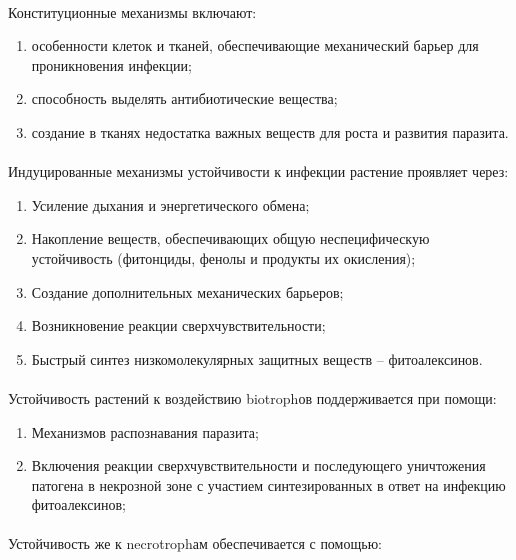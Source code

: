 \paragraph*{}Конституционные механизмы включают: 

\begin{enumerate}
	\item особенности клеток и тканей, обеспечивающие механический барьер для проникновения инфекции;
	\item способность выделять антибиотические вещества; 
	\item создание в тканях недостатка важных веществ для роста и развития паразита. 
\end{enumerate}

\paragraph*{}Индуцированные механизмы устойчивости к инфекции растение проявляет через:

\begin{enumerate}
	\item Усиление дыхания и энергетического обмена;
	\item Накопление веществ, обеспечивающих общую неспецифическую устойчивость (фитонциды, фенолы и продукты их окисления); 
	\item Создание дополнительных механических барьеров; 
	\item Возникновение реакции сверхчувствительности; 
	\item Быстрый синтез низкомолекулярных защитных веществ -- фитоалексинов.
\end{enumerate}

\paragraph*{}Устойчивость растений к воздействию \gls{biotroph}ов поддерживается при помощи: 

\begin{enumerate}
	\item Механизмов распознавания паразита; 
	\item Включения реакции сверхчувствительности и последующего уничтожения патогена в некрозной зоне с участием синтезированных в ответ на инфекцию фитоалексинов;
\end{enumerate}

\paragraph*{}Устойчивость же к \gls{necrotroph}ам обеспечивается с помощью: 

